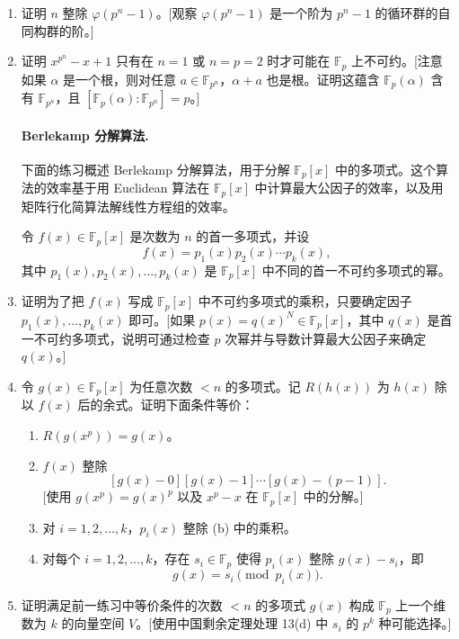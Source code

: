 \begin{enumerate}
\item 证明 $n$ 整除 $\varphi(p^n-1)$。[观察 $\varphi(p^n-1)$ 是一个阶为 $p^n-1$ 的循环群的自同构群的阶。]

\item 证明 $x^{p^n}-x+1$ 只有在 $n=1$ 或 $n=p=2$ 时才可能在 $\mathbb F_p$ 上不可约。[注意如果 $\alpha$ 是一个根，则对任意 $a\in\mathbb F_{p^n}$，$\alpha+a$ 也是根。证明这蕴含 $\mathbb F_p(\alpha)$ 含有 $\mathbb F_{p^n}$，且 $[\mathbb F_p(\alpha):\mathbb F_{p^n}]=p$。]

\paragraph{Berlekamp 分解算法.} 下面的练习概述 Berlekamp 分解算法，用于分解 $\mathbb F_p[x]$ 中的多项式。这个算法的效率基于用 Euclidean 算法在 $\mathbb F_p[x]$ 中计算最大公因子的效率，以及用矩阵行化简算法解线性方程组的效率。

令 $f(x)\in\mathbb F_p[x]$ 是次数为 $n$ 的首一多项式，并设
\[
f(x)=p_1(x)p_2(x)\cdots p_k(x),
\]
其中 $p_1(x),p_2(x),\ldots,p_k(x)$ 是 $\mathbb F_p[x]$ 中不同的首一不可约多项式的幂。

\item 证明为了把 $f(x)$ 写成 $\mathbb F_p[x]$ 中不可约多项式的乘积，只要确定因子 $p_1(x),\ldots,p_k(x)$ 即可。[如果 $p(x)=q(x)^N\in\mathbb F_p[x]$，其中 $q(x)$ 是首一不可约多项式，说明可通过检查 $p$ 次幂并与导数计算最大公因子来确定 $q(x)$。]

\item 令 $g(x)\in\mathbb F_p[x]$ 为任意次数 $<n$ 的多项式。记 $R(h(x))$ 为 $h(x)$ 除以 $f(x)$ 后的余式。证明下面条件等价：
\begin{enumerate}[label=(\alph*)]
\item $R(g(x^p))=g(x)$。
\item $f(x)$ 整除
\[
[g(x)-0][g(x)-1]\cdots[g(x)-(p-1)].
\]
[使用 $g(x^p)=g(x)^p$ 以及 $x^p-x$ 在 $\mathbb F_p[x]$ 中的分解。]
\item 对 $i=1,2,\ldots,k$，$p_i(x)$ 整除 (b) 中的乘积。
\item 对每个 $i=1,2,\ldots,k$，存在 $s_i\in\mathbb F_p$ 使得 $p_i(x)$ 整除 $g(x)-s_i$，即
\[
g(x)=s_i\pmod{p_i(x)}.
\]
\end{enumerate}

\item 证明满足前一练习中等价条件的次数 $<n$ 的多项式 $g(x)$ 构成 $\mathbb F_p$ 上一个维数为 $k$ 的向量空间 $V$。[使用中国剩余定理处理 13(d) 中 $s_i$ 的 $p^k$ 种可能选择。]


\end{enumerate}
